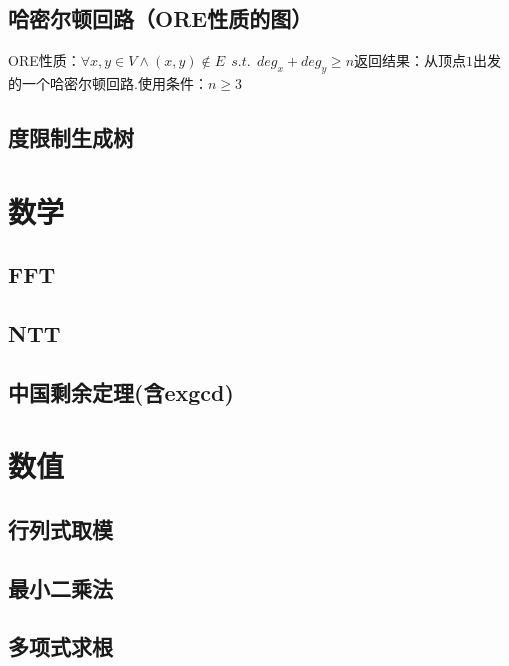 \documentclass[landscape,a4paper]{article}
\begin{document}
\begin{spacing}{0.3}
\begin{multicols}{3}
\subsection{哈密尔顿回路（ORE性质的图）}
ORE性质：$\forall x,y \in V \wedge (x,y) \notin E \ \ s.t. \ \ deg_x+deg_y \geq n$返回结果：从顶点$1$出发的一个哈密尔顿回路.使用条件：$n \geq 3$

\subsection{度限制生成树}

		
	\section{数学}
		\subsection{FFT}
		
		\subsection{NTT}
		
		\subsection{中国剩余定理(含exgcd)}
		

	\section{数值}
	\subsection{行列式取模}
	
	\subsection{最小二乘法}
	
	\subsection{多项式求根}
	

\end{multicols}
\end{spacing}
\end{document}
